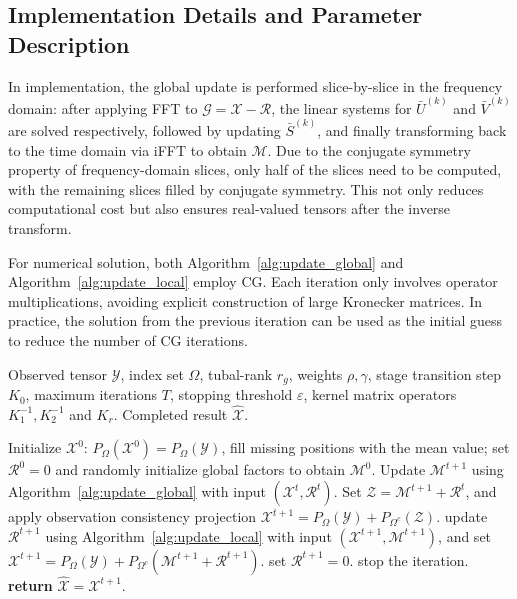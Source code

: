 \documentclass[a4paper,12pt]{article}
\numberwithin{equation}{section}
\numberwithin{algorithm}{section}
\theoremstyle{remark}
\theoremstyle{definition}
\begin{document}
\subsection{Implementation Details and Parameter Description}
\label{sec:impl}
In implementation, the global update is performed slice-by-slice in the frequency domain: after applying FFT to $\mathcal{G}=\mathcal{X}-\mathcal{R}$, the linear systems for $\bar U^{(k)}$ and $\bar V^{(k)}$ are solved respectively, followed by updating $\bar S^{(k)}$, and finally transforming back to the time domain via iFFT to obtain $\mathcal{M}$. Due to the conjugate symmetry property of frequency-domain slices, only half of the slices need to be computed, with the remaining slices filled by conjugate symmetry. This not only reduces computational cost but also ensures real-valued tensors after the inverse transform.

For numerical solution, both Algorithm~\ref{alg:update_global} and Algorithm~\ref{alg:update_local} employ CG. Each iteration only involves operator multiplications, avoiding explicit construction of large Kronecker matrices. In practice, the solution from the previous iteration can be used as the initial guess to reduce the number of CG iterations.

\begin{algorithm}[!htbp]
	\caption{Overall Update Procedure}
	\label{alg:overall}
	\begin{algorithmic}[1]
		\REQUIRE Observed tensor $\mathcal{Y}$, index set $\Omega$, tubal-rank $r_g$, weights $\rho,\gamma$, stage transition step $K_0$, maximum iterations $T$, stopping threshold $\varepsilon$, kernel matrix operators $K_1^{-1},K_2^{-1}$ and $K_r$.
		\ENSURE Completed result $\widehat{\mathcal{X}}$.
		
		\STATE Initialize $\mathcal{X}^{0}$: $P_{\Omega}(\mathcal{X}^{0})=P_{\Omega}(\mathcal{Y})$, fill missing positions with the mean value; set $\mathcal{R}^{0}=0$ and {\color{blue} randomly initialize global factors to obtain} $\mathcal{M}^{0}$.
		\STATE Update $\mathcal{M}^{t+1}$ using Algorithm~\ref{alg:update_global} with input $(\mathcal{X}^{t},\mathcal{R}^{t})$.
		\STATE Set $\mathcal{Z}=\mathcal{M}^{t+1}+\mathcal{R}^{t}$, and apply observation consistency projection $\mathcal{X}^{t+1}=P_{\Omega}(\mathcal{Y})+P_{\Omega^c}(\mathcal{Z})$.
		\STATE update $\mathcal{R}^{t+1}$ using Algorithm~\ref{alg:update_local} with input $(\mathcal{X}^{t+1},\mathcal{M}^{t+1})$, and set $\mathcal{X}^{t+1}=P_{\Omega}(\mathcal{Y})+P_{\Omega^c}(\mathcal{M}^{t+1}+\mathcal{R}^{t+1})$. \ELSE
		\STATE set $\mathcal{R}^{t+1}=0$.
		\ENDIF
		\STATE stop the iteration.
		\ENDIF
		\ENDFOR
		\STATE \textbf{return} $\widehat{\mathcal{X}}=\mathcal{X}^{t+1}$.
	\end{algorithmic}
\end{algorithm}
\end{document}
